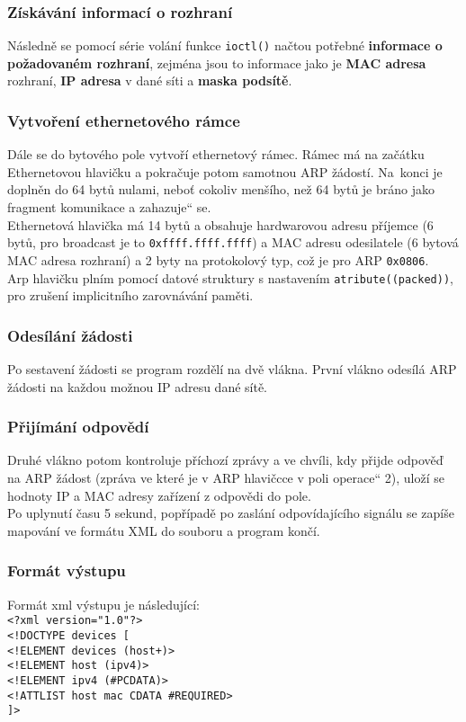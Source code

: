 \documentclass[11pt,a4paper,titlepage]{article}
\providecommand{\czq}[1]{\quotedblbase #1\textquotedblleft}
\begin{document}
\subsubsection{Získávání informací o rozhraní}
Následně se pomocí série volání funkce
\texttt{ioctl()} načtou potřebné \textbf{informace o požadovaném rozhraní}, zejména jsou to informace jako je \textbf{MAC adresa} rozhraní, 
\textbf{IP adresa} v dané síti a \textbf{maska podsítě}.
\cite{web:ioctl}
\subsubsection{Vytvoření ethernetového rámce}
Dále se do bytového pole vytvoří ethernetový rámec.
Rámec má na začátku Ethernetovou hlavičku a pokračuje potom samotnou ARP žádostí. Na~konci je 
doplněn do 64 bytů nulami, neboť cokoliv menšího, než 64 bytů je bráno jako fragment komunikace
a \czq{zahazuje}  se.\\
Ethernetová hlavička má 14 bytů a obsahuje hardwarovou adresu příjemce (6 bytů, pro broadcast je to \texttt{0xffff.ffff.ffff})
a MAC adresu odesilatele (6 bytová MAC adresa rozhraní) a 2 byty na protokolový typ, což je pro ARP \texttt{0x0806}.\\
Arp hlavičku plním pomocí datové struktury s nastavením
\texttt{\textunderscore\textunderscore atribute\textunderscore\textunderscore((packed))},
pro zrušení implicitního zarovnávání paměti.
\subsubsection{Odesílání žádosti}
Po sestavení žádosti se program rozdělí na dvě vlákna. První vlákno odesílá ARP žádosti na každou možnou IP adresu
dané sítě.\\
\subsubsection{Přijímání odpovědí}
Druhé vlákno potom kontroluje příchozí zprávy a ve chvíli, kdy přijde odpověď na ARP žádost 
(zpráva ve které je v ARP hlavičcce v poli \czq{operace} 2), uloží se hodnoty IP a MAC adresy zařízení z odpovědi do pole.\\
Po uplynutí času 5 sekund, popřípadě po zaslání odpovídajícího signálu se zapíše mapování
ve formátu XML do souboru a program končí.

\subsubsection{Formát výstupu}
Formát xml výstupu je následující:\\
\texttt{<?xml version="1.0"?>}\\
\texttt{<!DOCTYPE devices [}\\
\texttt{<!ELEMENT devices (host+)>}\\
\texttt{<!ELEMENT host (ipv4)>}\\
\texttt{<!ELEMENT ipv4 (\#PCDATA)>}\\
\texttt{<!ATTLIST host mac CDATA \#REQUIRED>}\\
\texttt{]>}\\
\end{document}
